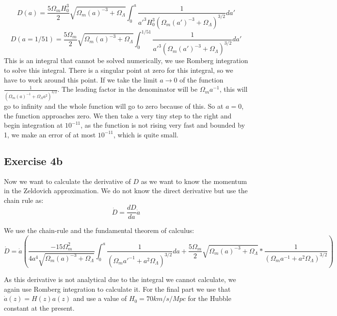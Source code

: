 \begin{equation}
    D(a)=\frac{5\Omega_m H_0^3}{2}\sqrt{\Omega_m(a)^{-3}+\Omega_{\Lambda}}\displaystyle\int_{0}^{a}{\frac{1}{a'^3H_0^3\left(\Omega_m(a')^{-3}+\Omega_{\Lambda}\right)^{3/2}}da'}
\end{equation}
\begin{equation}
    D(a=1/51)=\frac{5\Omega_m}{2}\sqrt{\Omega_m(a)^{-3}+\Omega_{\Lambda}}\displaystyle\int_{0}^{1/51}{\frac{1}{a'^3\left(\Omega_m(a')^{-3}+\Omega_{\Lambda}\right)^{3/2}}da'}
\end{equation}
This is an integral that cannot be solved numerically, we use Romberg integration to solve this integral. There is a singular point at zero for this integral, so we have to work around this point. If we take the limit $a\rightarrow 0$ of the function $\frac{1}{\left(\Omega_m(a)^{-1}+\Omega_{\Lambda}a^2\right)^{3/2}}$. The leading factor in the denominator will be $\Omega_m a^{-1}$, this will go to infinity and the whole function will go to zero because of this. So at $a=0$, the function approaches zero. We then take a very tiny step to the right and begin integration at $10^{-11}$, as the function is not rising very fast and bounded by 1, we make an error of at most $10^{-11}$, which is quite small.




\subsection{Exercise 4b}
Now we want to calculate the derivative of $D$ as we want to know the momentum in the Zeldovich approximation. We do not know the direct derivative but use the chain rule as:
\begin{equation}
    \dot{D}=\frac{dD}{da}\dot{a}
\end{equation}

We use the chain-rule and the fundamental theorem of calculus:
\begin{equation}
    \dot{D}=\dot{a}\left(\frac{-15\Omega_m^2}{4a^4\sqrt{\Omega_m(a)^{-3}+\Omega_{\Lambda}}}\displaystyle\int_{0}^{a}{\frac{1}{\left(\Omega_ma'^{-1}+a^2\Omega_{\Lambda}\right)^{3/2}}da}+\frac{5\Omega_m}{2}\sqrt{\Omega_m(a)^{-3}+\Omega_{\Lambda}}*\frac{1}{\left(\Omega_ma^{-1}+a^2\Omega_{\Lambda}\right)^{3/2}}   \right)
\end{equation}

As this derivative is not analytical due to the integral we cannot calculate, we again use Romberg integration to calculate it. For the final part we use that $\dot{a}(z)=H(z)a(z)$ and use a value of $H_0=70km/s/Mpc$ for the Hubble constant at the present.


